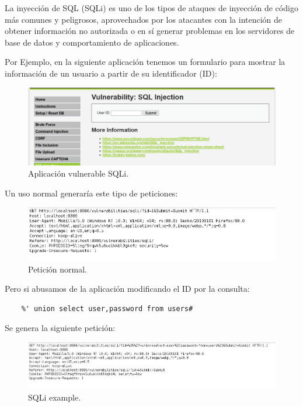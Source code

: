 La inyección de SQL (SQLi) es uno de los tipos de ataques de inyección de código más
comunes y peligrosos, aprovechados por los atacantes con la intención de obtener
información no autorizada o en sí generar problemas en los servidores de base de datos y
comportamiento de aplicaciones.

Por Ejemplo, en la siguiente aplicación tenemos un formulario para mostrar 
la información de un usuario a partir de su identificador (ID):

\begin{figure}[h!]  
    \includegraphics[width=\linewidth]{./imagenes/013_SQLi_Example_1.png}
    \caption{Aplicación vulnerable SQLi.}  
    \label{fig:2 - SQLi 1}
\end{figure}

Un uso normal generaría este tipo de peticiones:

\begin{figure}[h!]  
    \includegraphics[width=\linewidth]{./imagenes/013_SQLi_Example_2.png}
    \caption{Petición normal.}  
    \label{fig:3 - SQLi 2}
\end{figure}

Pero si abusamos de la aplicación modificando el ID por la consulta:
\begin{verbatim}
    %' union select user,password from users# 
\end{verbatim}

Se genera la siguiente petición:
\begin{figure}[h!]  
    \includegraphics[width=\linewidth]{./imagenes/013_SQLi_Example_3.png}
    \caption{SQLi example.}  
    \label{fig:4 - SQLi 3}
\end{figure}

